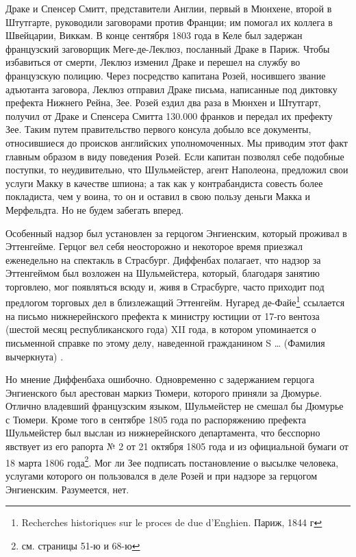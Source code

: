 \documentclass[
  oneside,
  12pt,
  titlepage]{book}
\begin{document}
Драке и Спенсер Смитт, представители Англии, первый в Мюнхене, второй в Штутгарте, руководили заговорами против Франции; им помогал их коллега в Швейцарии, Виккам. В конце сентября 1803 года в Келе был задержан французский заговорщик Меге-де-Леклюз, посланный Драке в Париж. Чтобы избавиться от смерти, Леклюз изменил Драке и перешел на службу во французскую полицию. Через посредство капитана Розей, носившего звание адъютанта заговора, Леклюз отправил Драке письма, написанные под диктовку префекта Нижнего Рейна, Зее. Розей ездил два раза в Мюнхен и Штутгарт, получил от Драке и Спенсера Смитта 130.000 франков и передал их префекту Зее. Таким путем правительство первого консула добыло все документы, относившиеся до происков английских уполномоченных. Мы приводим этот факт главным образом в виду поведения Розей. Если капитан позволял себе подобные поступки, то неудивительно, что Шульмейстер, агент Наполеона, предложил свои услуги Макку в качестве шпиона; а так как у контрабандиста совесть более покладиста, чем у воина, то он и оставил в свою пользу деньги Макка и Мерфельдта. Но не будем забегать вперед.

Особенный надзор был установлен за герцогом Энгиенским, который проживал в Эттенгейме. Герцог вел себя неосторожно и некоторое время приезжал еженедельно на спектакль в Страсбург. Диффенбах полагает, что надзор за Эттенгеймом был возложен на Шульмейстера, который, благодаря занятию торговлею, мог появляться всюду и, живя в Страсбурге, часто приходит под предлогом торговых дел в близлежащий Эттенгейм. Нугаред де-Файе\footnote{Recherches historiques sur le proces de due d'Enghien. Париж, 1844 г} ссылается на письмо нижнерейнского префекта к министру юстиции от 17-го вентоза (шестой месяц республиканского года) XII года, в котором упоминается о письменной справке по этому делу, наведенной гражданином S \ldots{} (Фамилия вычеркнута) .

Но мнение Диффенбаха ошибочно. Одновременно с задержанием герцога Энгиенского был арестован маркиз Тюмери, которого приняли за Дюмурье. Отлично владевший французским языком, Шульмейстер не смешал бы Дюмурье с Тюмери. Кроме того в сентябре 1805 года по распоряжению префекта Шульмейстер был выслан из нижнерейнского департамента, что бесспорно явствует из его рапорта № 2 от 21 октября 1805 года и из официальной бумаги от 18 марта 1806 года\footnote{см. страницы 51-ю и 68-ю}. Мог ли Зее подписать постановление о высылке человека, услугами которого он пользовался в деле Розей и при надзоре за герцогом Энгиенским. Разумеется, нет.
\end{document}
